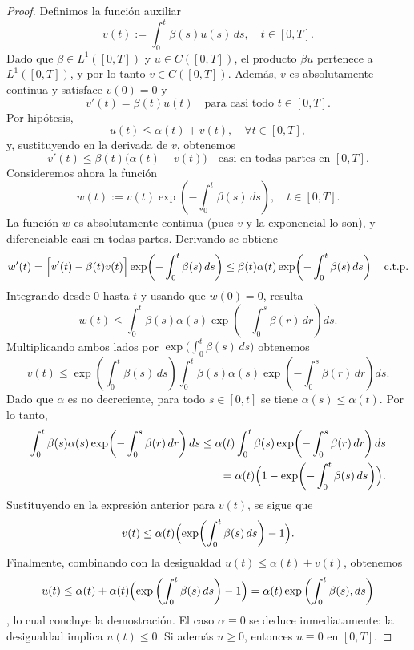 \documentclass[
  spanish,
  us-letterpaper,
]{scrreprt}
\theoremstyle{plain}
\theoremstyle{plain}
\theoremstyle{definition}
\theoremstyle{remark}
\begin{document}
\begin{proof}
Definimos la función auxiliar
\[v(t) := \int_{0}^{t} \beta(s) u(s) \, ds, \quad t \in [0,T].\] Dado
que \(\beta \in L^{1}([0,T])\) y \(u \in C([0,T])\), el producto
\(\beta u\) pertenece a \(L^{1}([0,T])\), y por lo tanto
\(v \in C([0,T])\). Además, \(v\) es absolutamente continua y satisface
\(v(0) = 0\) y
\[v'(t) = \beta(t) u(t) \quad \text{para casi todo } t \in [0,T].\] Por
hipótesis, \[u(t) \leq \alpha(t) + v(t), \quad \forall t \in [0,T],\] y,
sustituyendo en la derivada de \(v\), obtenemos
\[v'(t) \leq \beta(t) \bigl( \alpha(t) + v(t) \bigr) \quad \text{casi en todas partes en } [0,T].\]
Consideremos ahora la función
\[w(t) := v(t) \exp\!\left( -\int_{0}^{t} \beta(s) \, ds \right), \quad t \in [0,T].\]
La función \(w\) es absolutamente continua (pues \(v\) y la exponencial
lo son), y diferenciable casi en todas partes. Derivando se obtiene
\[w'(t) = \Bigl[ v'(t) - \beta(t) v(t) \Bigr] \exp\!\left( -\int_{0}^{t} \beta(s) \, ds \right)
\leq \beta(t) \alpha(t) \exp\!\left( -\int_{0}^{t} \beta(s) \, ds \right) \quad \text{c.t.p.}\]
Integrando desde \(0\) hasta \(t\) y usando que \(w(0) = 0\), resulta
\[w(t) \leq \int_{0}^{t} \beta(s) \alpha(s) \exp\!\left( -\int_{0}^{s} \beta(r) \, dr \right) ds.\]
Multiplicando ambos lados por
\(\exp\bigl(\int_{0}^{t} \beta(s) \, ds \bigr)\) obtenemos
\[v(t) \leq \exp\!\left( \int_{0}^{t} \beta(s) \, ds \right) \int_{0}^{t} \beta(s) \alpha(s) \exp\!\left( -\int_{0}^{s} \beta(r) \, dr \right) ds.\]
Dado que \(\alpha\) es no decreciente, para todo \(s \in [0,t]\) se
tiene \(\alpha(s) \leq \alpha(t)\). Por lo tanto, \begin{align*}
\int_{0}^{t} \beta(s) \alpha(s) \exp\!\left( -\int_{0}^{s} \beta(r) \, dr \right) ds
\leq \alpha(t) \int_{0}^{t} \beta(s) \exp\!\left( -\int_{0}^{s} \beta(r) \, dr \right) ds\\
=\alpha(t) \Bigl( 1 - \exp\!\left( -\int_{0}^{t} \beta(s) \, ds \right) \Bigr).
\end{align*} Sustituyendo en la expresión anterior para \(v(t)\), se
sigue que
\[v(t) \leq \alpha(t) \Bigl( \exp\!\left( \int_{0}^{t} \beta(s) \, ds \right) - 1 \Bigr).\]
Finalmente, combinando con la desigualdad
\(u(t) \leq \alpha(t) + v(t)\), obtenemos
\[u(t) \leq \alpha(t) + \alpha(t) \Bigl( \exp \left( \int_{0}^{t} \beta(s) \, ds \right) - 1 \Bigr)
= \alpha(t) \exp \left( \int_{0}^{t} \beta(s), ds \right)\], lo cual
concluye la demostración. El caso \(\alpha \equiv 0\) se deduce
inmediatamente: la desigualdad implica \(u(t) \leq 0\). Si además
\(u \geq 0\), entonces \(u \equiv 0\) en \([0,T].\)
\end{proof}
\end{document}
